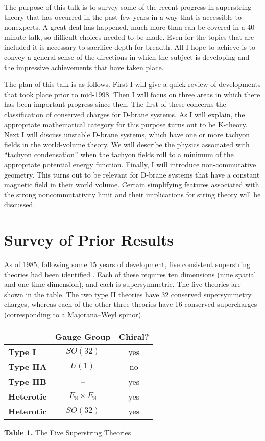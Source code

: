 \documentclass[a4paper,12pt]{article}
\begin{document}
The purpose of this talk is to survey some of the recent progress
in superstring theory that has occurred in the past few years in a
way that is accessible to nonexperts. A great deal has happened,
much more than can be covered in a 40-minute talk, so difficult
choices needed to be made.  Even for the topics that are included
it is necessary to sacrifice depth for breadth. All I hope to
achieve is to convey a general sense of the directions in which
the subject is developing and the impressive achievements that
have taken place.

The plan of this talk is as follows.  First I will give a quick
review of developments that took place prior to mid-1998.  Then I
will focus on three areas in which there has been important
progress since then.  The first of these concerns the
classification of conserved charges for D-brane systems.  As I
will explain, the appropriate mathematical category for this
purpose turns out to be K-theory.  Next I will discuss unstable
D-brane systems, which have one or more tachyon fields in the
world-volume theory.  We will describe the physics associated with
``tachyon condensation'' when the tachyon fields roll to a minimum
of the appropriate potential energy function. Finally, I will
introduce non-commutative geometry.  This turns out to be relevant
for D-brane systems that have a constant magnetic field in their
world volume.  Certain simplifying features associated with the
strong noncommutativity limit and their implications for string
theory will be discussed.

\section{Survey of Prior Results}

As of 1985, following some 15 years of development, five
consistent superstring theories had been identified \cite{GSW}.  Each of
these requires ten dimensions (nine spatial and one time
dimension), and each is supersymmetric.  The five theories are
shown in the table. The two type II theories have 32 conserved
supersymmetry charges, whereas each of the other three theories
have 16 conserved supercharges (corresponding to a Majorana--Weyl
spinor).

\begin{center}
\vspace{.2in}

\begin{tabular}{l|c|c}
&\textbf{Gauge Group} & \textbf{Chiral?}\\ \hline \textbf{Type I}
& $SO(32)$ & yes\\ \hline \textbf{Type IIA} & $U(1)$ & no\\ \hline
\textbf{Type IIB} & -- & yes\\ \hline \textbf{Heterotic} & $E_8
\times E_8$ & yes\\ \hline \textbf{Heterotic} & $SO(32)$ & yes\\
\hline
\end{tabular}
\end{center}
\begin{center}
{\bf Table 1.}  The Five Superstring Theories
\end{center}
\end{document}
